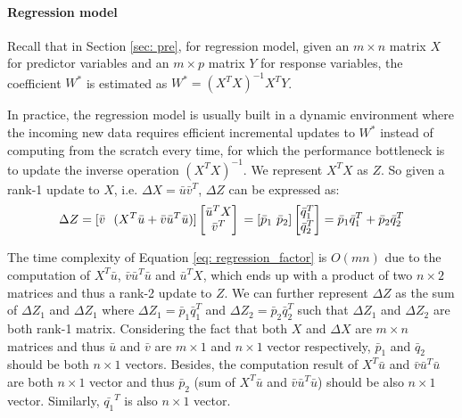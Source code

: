 \paragraph{Regression model}
Recall that in Section \ref{sec: pre}, for regression model, given an $m \times n$ matrix $X$ for predictor variables and an $m \times p$ matrix $Y$ for response variables,   the coefficient $W^*$ is estimated as $W^* = (X^TX)^{-1}X^TY$.

In practice, the regression model is usually built in a dynamic environment where the incoming new data requires efficient incremental updates to $W^*$ instead of computing from the scratch every time, for which the performance bottleneck is to update the inverse operation $(X^TX)^{-1}$. We represent $X^TX$ as $Z$. So given a rank-1 update to $X$, i.e. $\Delta X = \bar{u}\bar{v}^T$, $\Delta Z$ can be expressed as:
\begin{equation}\label{eq: regression_factor}
    \Delta Z = [\bar{v}\ \ (X^T\bar{u} + \bar{v}\bar{u}^T\bar{u})]\begin{bmatrix}
    \bar{u}^T X  \\
    \bar{v}^T  
\end{bmatrix}\\
=[\bar{p}_1\ \bar{p}_2]\begin{bmatrix}
    \bar{q}^T_1  \\
    \bar{q}^T_2  
\end{bmatrix}=\bar{p}_1\bar{q}_1^T + \bar{p}_2\bar{q}_2^T
\end{equation}

The time complexity of Equation \ref{eq: regression_factor} is $O(mn)$ due to the computation of $X^T\bar{u}$, $\bar{v}\bar{u}^T\bar{u}$ and $\bar{u}^TX$, which ends up with a product of two $n\times 2$ matrices and thus a rank-2 update to $Z$. We can further represent $\Delta Z$ as the sum of $\Delta Z_1$ and $\Delta Z_1$ where $\Delta Z_1 = \bar{p}_1\bar{q}_1^T$ and $\Delta Z_2 = \bar{p}_2\bar{q}_2^T$ such that $\Delta Z_1$ and $\Delta Z_2$ are both rank-1 matrix. Considering the fact that both $X$ and $\Delta X$ are $m \times n$ matrices and thus $\bar{u}$ and $\bar{v}$ are $m \times 1$ and $n \times 1$ vector respectively, $\bar{p}_1$ and $\bar{q}_2$ should be both $n \times 1$ vectors. Besides, the computation result of $X^T\bar{u}$ and $\bar{v}\bar{u}^T\bar{u}$ are both $n \times 1$ vector and thus $\bar{p}_2$ (sum of $X^T\bar{u}$ and $\bar{v}\bar{u}^T\bar{u}$) should be also $n \times 1$ vector. Similarly, $\bar{q_1}^T$ is also $n \times 1$ vector.

